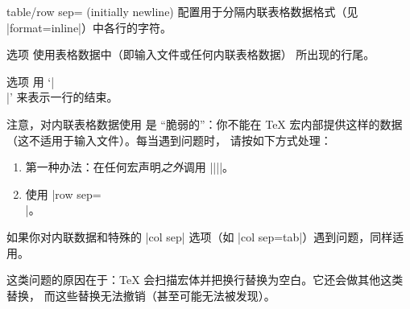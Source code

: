 \documentclass[a4paper,doc2]{ltxdoc}
\begin{document}
\begin{pgfplotskey}{table/row sep= (initially newline)}
    配置用于分隔内联表格数据格式（见 |format=inline|）中各行的字符。

    选项  使用表格数据中（即输入文件或任何内联表格数据）
    所出现的行尾。

    选项 \declaretext{\string\\} 用 `|\\|' 来表示一行的结束。

    注意，对内联表格数据使用  是 ``脆弱的''：你不能在
    \TeX{} 宏内部提供这样的数据（这不适用于输入文件）。每当遇到问题时，
    请按如下方式处理：
    \begin{enumerate}
        \item 第一种办法：在任何宏声明\emph{之外}调用
            |\pgfplotstableread||\yourmacro|。
        \item 使用 |row sep=\\|。
    \end{enumerate}
    如果你对内联数据和特殊的 |col sep| 选项（如 |col sep=tab|）遇到问题，同样适用。

    这类问题的原因在于：\TeX{} 会扫描宏体并把换行替换为空白。它还会做其他这类替换，
    而这些替换无法撤销（甚至可能无法被发现）。
\end{pgfplotskey}
\end{document}
